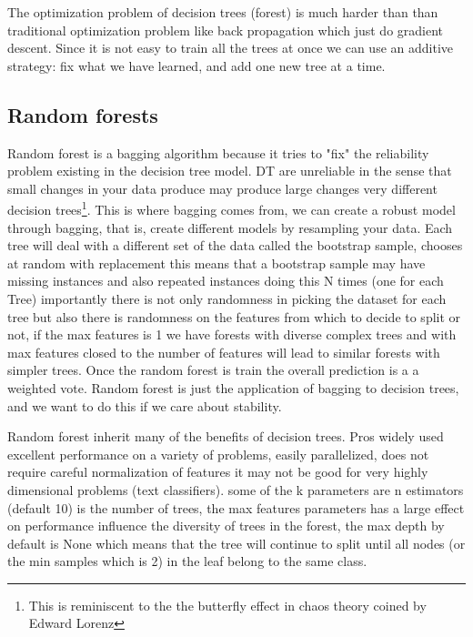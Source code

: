 \documentclass[12pt]{report}
\begin{document}
The optimization problem of decision trees (forest) is much harder than than traditional optimization problem like back propagation which just do gradient descent. Since it is not easy to train all the trees at once we can use an additive strategy: fix what we have learned, and add one new tree at a time. 

\subsection{Random forests}

Random forest is a bagging algorithm because it tries to "fix" the reliability problem existing in the decision tree model. DT are unreliable in the sense that small changes in your data produce may produce large changes very different decision trees\footnote{This is reminiscent to the the butterfly effect in chaos theory coined by Edward Lorenz}. This is where bagging comes from, we can create a robust model through bagging, that is, create different models by resampling your data. Each tree will deal with a different set of the data called the bootstrap sample, chooses at random with replacement this means that a bootstrap sample may have missing instances and also repeated instances doing this N times (one for each Tree) importantly there is not only randomness in picking the dataset for each tree but also there is randomness on the features from which to decide to split or not, if the max features is 1 we have forests with diverse complex trees and with max features closed to the number of features will lead to similar forests with simpler trees. Once the random forest is train the overall prediction is a a weighted vote.
Random forest is just the application of bagging to decision trees, and we want to do this if we care about stability.

Random forest inherit many of the benefits of decision trees. Pros widely used excellent performance on a variety of problems, easily parallelized, does not require careful normalization of features it may not be good for very highly dimensional problems (text classifiers). some of the k parameters are n estimators (default 10) is the number of trees, the max features parameters has a large effect on performance influence the diversity of trees in the forest, the max depth by default is None which means that the tree will continue to split until all nodes (or the min samples which is 2) in the leaf belong to the same class.
\end{document}
